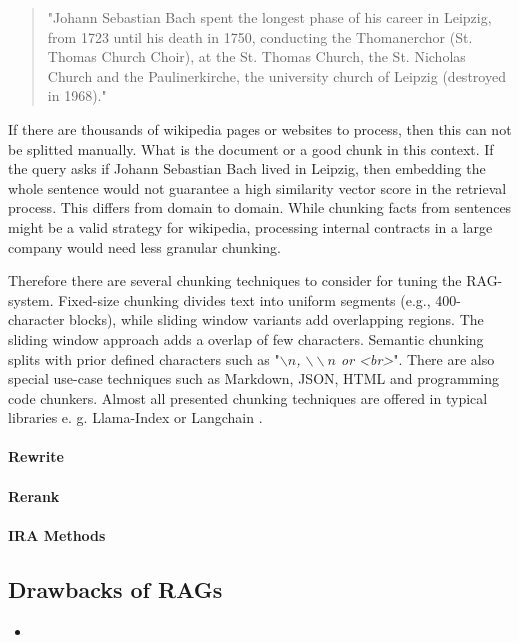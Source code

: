 \begin{quote}
    "Johann Sebastian Bach spent the longest phase of his career in Leipzig, from 1723 until his death in 1750, conducting the Thomanerchor (St. Thomas Church Choir), at the St. Thomas Church, the St. Nicholas Church and the Paulinerkirche, the university church of Leipzig (destroyed in 1968)."
\end{quote}

If there are thousands of wikipedia pages or websites to process, then this can not be splitted manually. What is the document or a good chunk in this context. If the query asks if Johann Sebastian Bach lived in Leipzig, then embedding the whole sentence would not guarantee a high similarity vector score in the retrieval process. This differs from domain to domain. While chunking facts from sentences might be a valid strategy for wikipedia, processing internal contracts in a large company would need less granular chunking. 

Therefore there are several chunking techniques to consider for tuning the RAG-system. Fixed-size chunking divides text into uniform segments (e.g., 400-character blocks), while sliding window variants add overlapping regions. The sliding window approach adds a overlap of few characters. Semantic chunking splits with prior defined characters such as "\textit{$\backslash n$, $\backslash\backslash n$ or <br>}". There are also special use-case techniques such as Markdown, JSON, HTML and programming code chunkers. Almost all presented chunking techniques are offered in typical libraries e. g. Llama-Index \cite{Liu_LlamaIndex_2022} or Langchain \cite{Chase_LangChain_2022}.



\paragraph{Rewrite}
\label{sec:rewrite}

\paragraph{Rerank}
\label{sec:rerank}

\paragraph{IRA Methods}
\label{sec:IRA}

\subsection{Drawbacks of RAGs}
\label{sec:drawbacks}

\begin{itemize}
    \item 
\end{itemize}